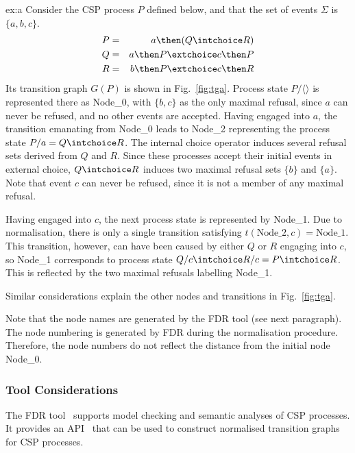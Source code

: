 \begin{example}{ex:a}
Consider the CSP process $P$ defined below, and that the set of events
$\Sigma$ is $\{a,b,c\}$.
\begin{eqnarray*}
P & = & a \then (Q\intchoice R)
\\
Q & = & a \then P \extchoice c \then P
\\
R & = & b \then P \extchoice c \then R
\end{eqnarray*}
Its transition graph $G(P)$ is shown in Fig.~\ref{fig:tga}. Process state
$P/\langle\rangle$ is represented there as Node\_0, with $\{ b,c\}$ as the
only maximal refusal, since $a$ can never be refused, and no other events are
accepted. Having engaged into $a$, the transition emanating from Node\_0
leads to Node\_2 representing  the process state $P/a = Q\intchoice R$. The
internal choice operator induces several refusal sets derived from $Q$ and
$R$. Since these processes accept their initial events in external choice,
$Q\intchoice R$ induces two maximal refusal sets $\{b\}$ and
$\{a\}$. Note that event $c$ can never be refused, since it is not a member
of any maximal refusal.

Having engaged into $c$, the next process state is represented by Node\_1.
Due to normalisation, there is only a single transition satisfying
$t(\text{Node\_2},c) = \text{Node\_1}$. This transition, however, can have
been caused by either $Q$ or $R$ engaging into $c$, so Node\_1 corresponds to
process state $Q/c \intchoice R/c = P \intchoice R$. This is reflected by the
two maximal refusals labelling Node\_1.

Similar considerations explain the other nodes and transitions in
Fig.~\ref{fig:tga}.

Note that the node names are generated by the FDR tool (see next paragraph).
The node numbering is generated by FDR during the normalisation procedure.
Therefore, the node numbers do not reflect the distance from the initial node
Node\_0.
\end{example}


\subsubsection*{Tool Considerations}
The FDR tool~\cite{fdr} supports model checking and semantic analyses of CSP
processes. It provides an API~\cite{fdrmanual} that can be used to construct
normalised transition graphs for CSP processes.

